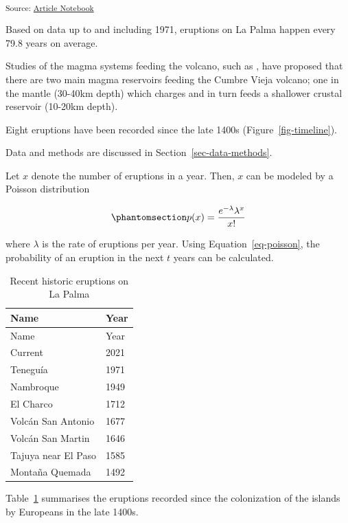 \documentclass[
  12pt]{article}
\begin{document}
\textsubscript{Source:
\href{https://jsds-sports.github.io/2026-matthews-001/index.qmd.html}{Article
Notebook}}

Based on data up to and including 1971, eruptions on La Palma happen
every 79.8 years on average.

Studies of the magma systems feeding the volcano, such as
\citet{marrero2019}, have proposed that there are two main magma
reservoirs feeding the Cumbre Vieja volcano; one in the mantle (30-40km
depth) which charges and in turn feeds a shallower crustal reservoir
(10-20km depth).

Eight eruptions have been recorded since the late 1400s
(Figure~\ref{fig-timeline}).

Data and methods are discussed in Section~\ref{sec-data-methods}.

Let \(x\) denote the number of eruptions in a year. Then, \(x\) can be
modeled by a Poisson distribution

\begin{equation}\protect\phantomsection\label{eq-poisson}{
p(x) = \frac{e^{-\lambda} \lambda^{x}}{x !}
}\end{equation}

where \(\lambda\) is the rate of eruptions per year. Using
Equation~\ref{eq-poisson}, the probability of an eruption in the next
\(t\) years can be calculated.

\begin{longtable}[]{@{}ll@{}}
\caption{Recent historic eruptions on La
Palma}\label{tbl-history}\tabularnewline
\toprule\noalign{}
Name & Year \\
\midrule\noalign{}
\endfirsthead
\toprule\noalign{}
Name & Year \\
\midrule\noalign{}
\endhead
\bottomrule\noalign{}
\endlastfoot
Current & 2021 \\
Teneguía & 1971 \\
Nambroque & 1949 \\
El Charco & 1712 \\
Volcán San Antonio & 1677 \\
Volcán San Martin & 1646 \\
Tajuya near El Paso & 1585 \\
Montaña Quemada & 1492 \\
\end{longtable}

Table~\ref{tbl-history} summarises the eruptions recorded since the
colonization of the islands by Europeans in the late 1400s.
\end{document}
